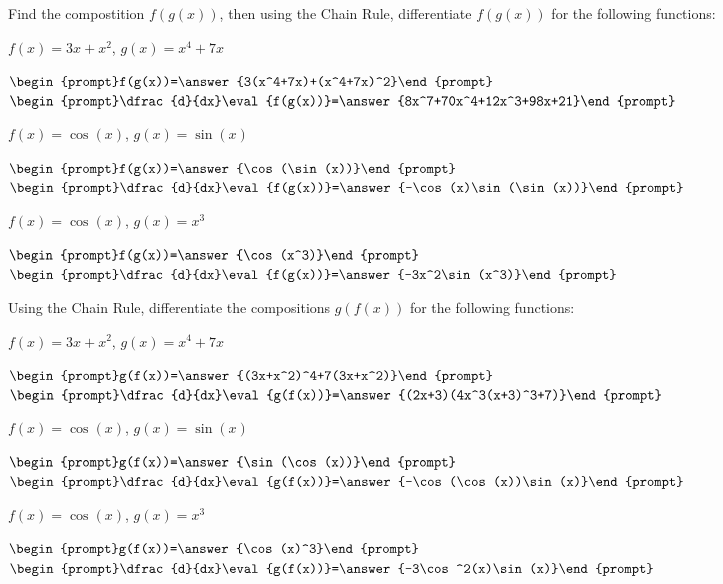 \documentclass{ximera}
\begin{document}
\begin{question}

Find the compostition $f(g(x))$, then using the Chain Rule, differentiate $f(g(x))$ for the following functions:

$f(x) = 3x+x^2$, $g(x) = x^4+7x$

$\begin{prompt}f(g(x))=\answer{3(x^4+7x)+(x^4+7x)^2}\end{prompt}$
$\begin{prompt}\dfrac{d}{dx}\eval{f(g(x))}=\answer{8x^7+70x^4+12x^3+98x+21}\end{prompt}$

$f(x) = \cos(x)$, $g(x) = \sin(x)$

$\begin{prompt}f(g(x))=\answer{\cos(\sin(x))}\end{prompt}$
$\begin{prompt}\dfrac{d}{dx}\eval{f(g(x))}=\answer{-\cos(x)\sin(\sin(x))}\end{prompt}$

$f(x) = \cos(x)$, $g(x) = x^3$

$\begin{prompt}f(g(x))=\answer{\cos(x^3)}\end{prompt}$
$\begin{prompt}\dfrac{d}{dx}\eval{f(g(x))}=\answer{-3x^2\sin(x^3)}\end{prompt}$

\end{question}

\begin{question}

Using the Chain Rule, differentiate the compositions $g(f(x))$ for the following functions:

$f(x) = 3x+x^2$, $g(x) = x^4+7x$

$\begin{prompt}g(f(x))=\answer{(3x+x^2)^4+7(3x+x^2)}\end{prompt}$
$\begin{prompt}\dfrac{d}{dx}\eval{g(f(x))}=\answer{(2x+3)(4x^3(x+3)^3+7)}\end{prompt}$

$f(x) = \cos(x)$, $g(x) = \sin(x)$

$\begin{prompt}g(f(x))=\answer{\sin(\cos(x))}\end{prompt}$
$\begin{prompt}\dfrac{d}{dx}\eval{g(f(x))}=\answer{-\cos(\cos(x))\sin(x)}\end{prompt}$

$f(x) = \cos(x)$, $g(x) = x^3$

$\begin{prompt}g(f(x))=\answer{\cos(x)^3}\end{prompt}$
$\begin{prompt}\dfrac{d}{dx}\eval{g(f(x))}=\answer{-3\cos^2(x)\sin(x)}\end{prompt}$


\end{question}
\end{document}
